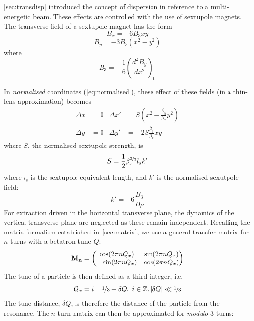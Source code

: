 \documentclass[11pt]{report}
\begin{document}
\autoref{sec:transdisp} introduced the concept of dispersion in reference to a multi-energetic beam. These effects are controlled with the use of sextupole magnets. The transverse field of a sextupole magnet has the form
\begin{equation}
  B_x = -6B_3xy
\end{equation}
\begin{equation}
  B_y = -3B_3(x^2-y^2)
\end{equation} where
\begin{equation}
  B_3=-\frac 16\left(\frac{d^2B_y}{dx^2}\right)_0
\end{equation}

In \textit{normalised} coordinates (\autoref{eq:normalised}), these effect of these fields (in a thin-lens approximation) becomes
\begin{align*}
  \Delta x&=0 & \Delta x'&=S(x^2-\frac{\beta_y}{\beta_x}y^2) \\
  \Delta y&=0 & \Delta y'&=-2S\frac{\beta_y}{\beta_x}xy
\end{align*}
where $S$, the normalised sextupole strength, is
\begin{equation}
  S=\frac 12\beta_x^{\nicefrac 23}l_sk'
  \label{eq:normalised_sextupole_strength}
\end{equation} where $l_s$ is the sextupole equivalent length, and $k'$ is the normalised sexutpole field:
\begin{equation}
  k'=-6\frac{B_3}{B\rho}
\end{equation}
For extraction driven in the horizontal transverse plane, the dynamics of the vertical transverse plane are neglected as these remain independent. Recalling the matrix formalism established in~\autoref{sec:matrix}, we use a general transfer matrix for $n$ turns with a betatron tune $Q$:
\begin{equation}
  \bf M_n=
  \begin{pmatrix}
    \cos(2\pi nQ_x)  & \sin(2\pi nQ_x) \\
    -\sin(2\pi nQ_x) & \cos(2\pi nQ_x)
  \end{pmatrix}
\end{equation}
The tune of a particle is then defined as a third-integer, i.e.
\begin{equation}
  Q_x=i\pm\nicefrac 13 +\delta Q,\ i\in\mathbb{Z}, |\delta Q|\ll\nicefrac 13
\end{equation} 
The tune distance, $\delta Q$, is therefore the distance of the particle from the resonance. The $n$-turn matrix can then be approximated for \textit{modulo}-3 turns:
\end{document}
